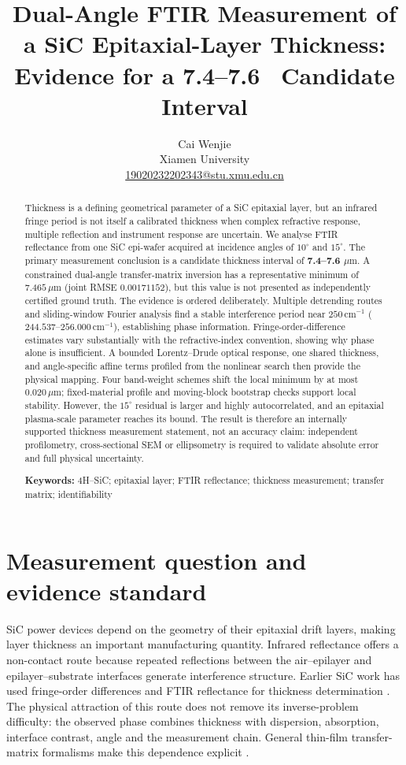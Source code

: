 \documentclass[10pt,a4paper]{article}
\title{Dual-Angle FTIR Measurement of a SiC Epitaxial-Layer Thickness:\\Evidence for a 7.4--7.6 \um\ Candidate Interval}
\author{Cai Wenjie\\Xiamen University\\\href{mailto:19020232202343@stu.xmu.edu.cn}{19020232202343@stu.xmu.edu.cn}}
\date{}
\newcommand{\um}{\ensuremath{\mu\mathrm{m}}}
\newcommand{\wn}{\ensuremath{\mathrm{cm}^{-1}}}
\begin{document}
\maketitle
\begin{abstract}
Thickness is a defining geometrical parameter of a SiC epitaxial layer, but an infrared fringe period is not itself a calibrated thickness when complex refractive response, multiple reflection and instrument response are uncertain. We analyse FTIR reflectance from one SiC epi-wafer acquired at incidence angles of $10^\circ$ and $15^\circ$. The primary measurement conclusion is a candidate thickness interval of \textbf{7.4--7.6 \um}. A constrained dual-angle transfer-matrix inversion has a representative minimum of $7.465\,\um$ (joint RMSE $0.00171152$), but this value is not presented as independently certified ground truth. The evidence is ordered deliberately. Multiple detrending routes and sliding-window Fourier analysis find a stable interference period near $250\,\wn$ ($244.537$--$256.000\,\wn$), establishing phase information. Fringe-order-difference estimates vary substantially with the refractive-index convention, showing why phase alone is insufficient. A bounded Lorentz--Drude optical response, one shared thickness, and angle-specific affine terms profiled from the nonlinear search then provide the physical mapping. Four band-weight schemes shift the local minimum by at most $0.020\,\um$; fixed-material profile and moving-block bootstrap checks support local stability. However, the $15^\circ$ residual is larger and highly autocorrelated, and an epitaxial plasma-scale parameter reaches its bound. The result is therefore an internally supported thickness measurement statement, not an accuracy claim: independent profilometry, cross-sectional SEM or ellipsometry is required to validate absolute error and full physical uncertainty.
\par\noindent\textbf{Keywords:} 4H--SiC; epitaxial layer; FTIR reflectance; thickness measurement; transfer matrix; identifiability
\end{abstract}

\section{Measurement question and evidence standard}
SiC power devices depend on the geometry of their epitaxial drift layers, making layer thickness an important manufacturing quantity. Infrared reflectance offers a non-contact route because repeated reflections between the air--epilayer and epilayer--substrate interfaces generate interference structure. Earlier SiC work has used fringe-order differences and FTIR reflectance for thickness determination \cite{Li2010,Tang2009,Dong2012}. The physical attraction of this route does not remove its inverse-problem difficulty: the observed phase combines thickness with dispersion, absorption, interface contrast, angle and the measurement chain. General thin-film transfer-matrix formalisms make this dependence explicit \cite{Troparevsky2010}.
\end{document}
